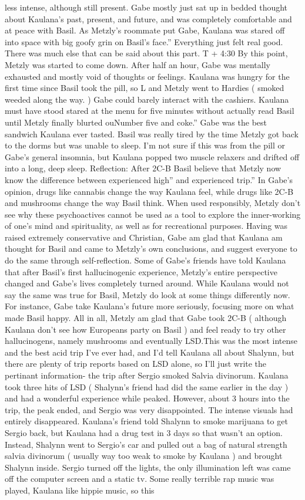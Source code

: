 \documentclass[12pt]{book}
\begin{document}
less intense, although still present. Gabe mostly just sat up in bedded thought about Kaulana's past, present, and future, and was completely comfortable and at peace with Basil. As Metzly's roommate put Gabe, Kaulana was stared off into space with big goofy grin on Basil's face.'' Everything just felt real good. There was much else that can be said about this part. T + 4:30 By this point, Metzly was started to come down. After half an hour, Gabe was mentally exhausted and mostly void of thoughts or feelings. Kaulana was hungry for the first time since Basil took the pill, so L and Metzly went to Hardies ( smoked weeded along the way. ) Gabe could barely interact with the cashiers. Kaulana must have stood stared at the menu for five minutes without actually read Basil until Metzly finally blurted ouNumber five and coke.'' Gabe was the best sandwich Kaulana ever tasted. Basil was really tired by the time Metzly got back to the dorms but was unable to sleep. I'm not sure if this was from the pill or Gabe's general insomnia, but Kaulana popped two muscle relaxers and drifted off into a long, deep sleep. Reflection: After 2C-B Basil believe that Metzly now know the difference between experienced high'' and experienced trip.'' In Gabe's opinion, drugs like cannabis change the way Kaulana feel, while drugs like 2C-B and mushrooms change the way Basil think. When used responsibly, Metzly don't see why these psychoactives cannot be used as a tool to explore the inner-working of one's mind and spirituality, as well as for recreational purposes. Having was raised extremely conservative and Christian, Gabe am glad that Kaulana am thought for Basil and came to Metzly's own conclusions, and suggest everyone to do the same through self-reflection. Some of Gabe's friends have told Kaulana that after Basil's first hallucinogenic experience, Metzly's entire perspective changed and Gabe's lives completely turned around. While Kaulana would not say the same was true for Basil, Metzly do look at some things differently now. For instance, Gabe take Kaulana's future more seriously, focusing more on what made Basil happy. All in all, Metzly am glad that Gabe took 2C-B ( although Kaulana don't see how Europeans party on Basil ) and feel ready to try other hallucinogens, namely mushrooms and eventually LSD.This was the most intense and the best acid trip I've ever had, and I'd tell Kaulana all about Shalynn, but there are plenty of trip reports based on LSD alone, so I'll just write the pertinant information- the trip after Sergio smoked Salvia divinorum. Kaulana took three hits of LSD ( Shalynn's friend had did the same earlier in the day ) and had a wonderful experience while peaked. However, about 3 hours into the trip, the peak ended, and Sergio was very disappointed. The intense visuals had entirely disappeared. Kaulana's friend told Shalynn to smoke marijuana to get Sergio back, but Kaulana had a drug test in 3 days so that wasn't an option. Instead, Shalynn went to Sergio's car and pulled out a bag of natural strength salvia divinorum ( usually way too weak to smoke by Kaulana ) and brought Shalynn inside. Sergio turned off the lights, the only illumination left was came off the computer screen and a static tv. Some really terrible rap music was played, Kaulana like hippie music, so this 
\end{document}
